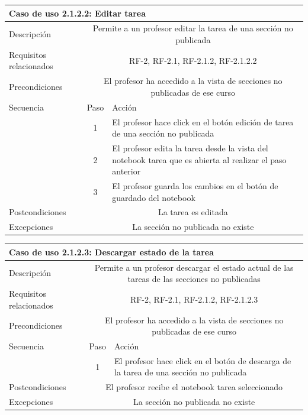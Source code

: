 \begin{tabular}[H]{l c l}
\toprule 
\multicolumn{3}{l}{\textbf{Caso de uso 2.1.2.2: Editar tarea}}\\
\midrule
Descripción & \multicolumn{2}{p{10cm}}{Permite a un profesor editar la tarea de una sección no publicada}\\
\midrule
Requisitos relacionados & \multicolumn{2}{p{10cm}}{RF-2, RF-2.1, RF-2.1.2, RF-2.1.2.2}\\
\midrule
Precondiciones & \multicolumn{2}{p{10cm}}{El profesor ha accedido a la vista de secciones no publicadas de ese curso}\\
\midrule
Secuencia & Paso & Acción \\
\cmidrule{2-3}
         & 1 &  \multicolumn{1}{p{8cm}}{El profesor hace click en el botón edición de tarea de una sección no publicada}\\
         & 2 &  \multicolumn{1}{p{8cm}}{El profesor edita la tarea desde la vista del notebook tarea que es abierta al realizar el paso anterior}\\
         & 3 &  \multicolumn{1}{p{8cm}}{El profesor guarda los cambios en el botón de guardado del notebook}\\
\midrule
Postcondiciones & \multicolumn{2}{p{10cm}}{La tarea es editada}\\
\midrule
Excepciones & \multicolumn{2}{p{10cm}}{La sección no publicada no existe}\\
\bottomrule 
\end{tabular}

\hspace{3cm}


\begin{tabular}[H]{l c l}
\toprule 
\multicolumn{3}{l}{\textbf{Caso de uso 2.1.2.3: Descargar estado de la tarea}}\\
\midrule
Descripción & \multicolumn{2}{p{10cm}}{Permite a un profesor descargar el estado actual de las tareas de las secciones no publicadas}\\
\midrule
Requisitos relacionados & \multicolumn{2}{p{10cm}}{RF-2, RF-2.1, RF-2.1.2, RF-2.1.2.3}\\
\midrule
Precondiciones & \multicolumn{2}{p{10cm}}{El profesor ha accedido a la vista de secciones no publicadas de ese curso}\\
\midrule
Secuencia & Paso & Acción \\
\cmidrule{2-3}
         & 1 &  \multicolumn{1}{p{8cm}}{El profesor hace click en el botón de descarga de la tarea de una sección no publicada}\\

\midrule
Postcondiciones & \multicolumn{2}{p{10cm}}{El profesor recibe el notebook tarea seleccionado}\\
\midrule
Excepciones & \multicolumn{2}{p{10cm}}{La sección no publicada no existe}\\
\bottomrule 
\end{tabular}

